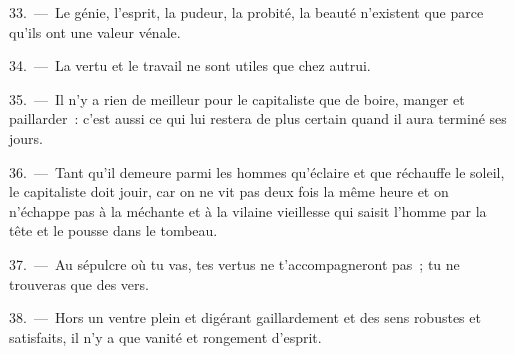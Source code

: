 \documentclass[french,twoside]{book} %
\begin{document}
33. — Le génie, l’esprit, la pudeur, la probité, la beauté n’existent que parce qu’ils ont une valeur vénale.\par
34. — La vertu et le travail ne sont utiles que chez autrui.\par
35. — Il n’y a rien de meilleur pour le capitaliste que de boire, manger et paillarder : c’est aussi ce qui lui restera de plus certain quand il aura terminé ses jours.\par
36. — Tant qu’il demeure parmi les hommes qu’éclaire et que réchauffe le soleil, le capitaliste doit jouir, car on ne vit pas deux fois la même heure et on n’échappe pas à la méchante et à la vilaine vieillesse qui saisit l’homme par la tête et le pousse dans le tombeau.\par
37. — Au sépulcre où tu vas, tes vertus ne t’accompagneront pas ; tu ne trouveras que des vers.\par
38. — Hors un ventre plein et digérant gaillardement et des sens robustes et satisfaits, il n’y a que vanité et rongement d’esprit.
\end{document}
